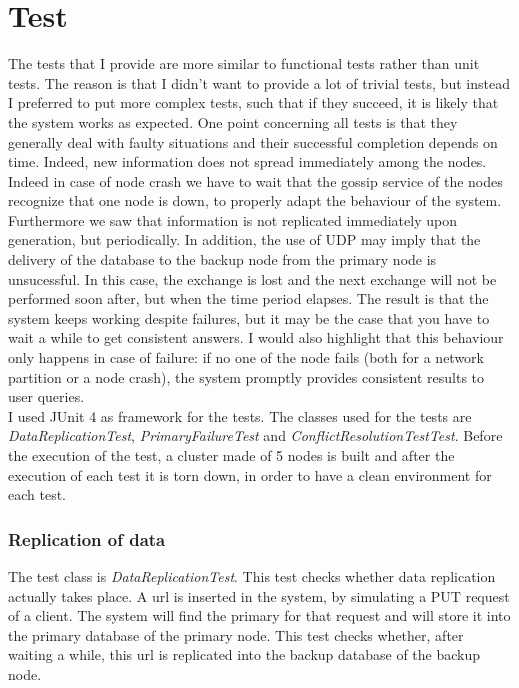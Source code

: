 \documentclass{article}
\begin{document}
\section{Test}
The tests that I provide are more similar to functional tests rather than unit tests. The reason is that I didn't want to provide a lot of trivial tests, but instead I preferred to put more complex tests, such that if they succeed, it is likely that the system works as expected. One point concerning all tests is that they generally deal with faulty situations and their successful completion depends on time. Indeed, new information does not spread immediately among the nodes. Indeed in case of node crash we have to wait that the gossip service of the nodes recognize that one node is down, to properly adapt the behaviour of the system. Furthermore we saw that information is not replicated immediately upon generation, but periodically. In addition, the use of UDP may imply that the delivery of the database to the backup node from the primary node is unsucessful. In this case, the exchange is lost and the next exchange will not be performed soon after, but when the time period elapses. The result is that the system keeps working despite failures, but it may be the case that you have to wait a while to get consistent answers. I would also highlight that this behaviour only happens in case of failure: if no one of the node fails (both for a network partition or a node crash), the system promptly provides consistent results to user queries. \\
I used JUnit 4 as framework for the tests. The classes used for the tests are \textit{DataReplicationTest}, \textit{PrimaryFailureTest} and \textit{ConflictResolutionTestTest}. Before the execution of the test, a cluster made of 5 nodes is built and after the execution of each test it is torn down, in order to have a clean environment for each test.


\subsubsection{Replication of data}
The test class is \textit{DataReplicationTest}. This test checks whether data replication actually takes place. A url is inserted in the system, by simulating a PUT request of a client. The system will find the primary for that request and will store it into the primary database of the primary node. This test checks whether, after waiting a while, this url is replicated into the backup database of the backup node.
\end{document}
